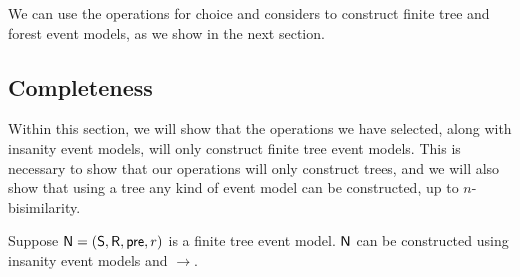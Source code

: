 We can use the operations for choice and considers to construct finite tree and
forest event models, as we show in the next section.

\subsection{Completeness} \label{subsec:multi:completeness}

Within this section, we will show that the operations we have selected, along with insanity event
models, will only construct finite tree event models.
This is necessary to show that our operations will only construct trees, and we will also show that
using a tree any kind of event model can be constructed, up to $n$-bisimilarity.

\begin{lemma} \label{finTreeConstruct}
Suppose $\mathrm{\mathsf{N}} = (\mathrm{\mathsf{S}}, \mathrm{\mathsf{R}}, \mathrm{\mathsf{pre}}, r)$ is a finite tree event model.
$\mathrm{\mathsf{N}}$ can be constructed using insanity event models and $\to$.
\end{lemma}
